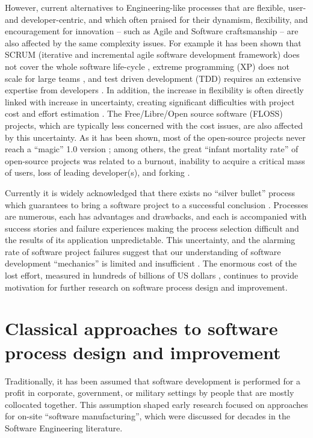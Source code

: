 However, current alternatives to Engineering-like processes that are flexible, user- and developer-centric,
and which often praised for their dynamism, flexibility, and encouragement for innovation --
such as Agile and Software craftsmanship -- are also affected by the same complexity issues. 
For example it has been shown that SCRUM (iterative and incremental agile software development framework) 
does not cover the whole software life-cycle \cite{Cohn_SCRUM}, 
extreme programming (XP) does not scale for large teams \cite{Beck_XP}, 
and test driven development (TDD) requires an extensive expertise from developers \cite{Beck_TDD}.
In addition, the increase in flexibility is often directly linked with increase in uncertainty, creating 
significant difficulties with project cost and effort estimation \cite{citeulike:12933080} \cite{citeulike:9928907}.
The Free/Libre/Open source software (FLOSS) projects, which are typically less concerned with the cost issues, 
are also affected by this uncertainty. 
As it has been shown, most of the open-source projects never reach a ``magic'' 1.0 version 
\cite{citeulike:12480029}; among others, the great ``infant mortality rate'' of open-source 
projects was related to a burnout, inability to acquire a critical mass of users, 
loss of leading developer(s), and forking \cite{richter2007critique}. 

Currently it is widely acknowledged that there exists no ``silver bullet'' process which 
guarantees to bring a software project to a successful conclusion \cite{citeulike:1986013}. 
Processes are numerous, each has advantages and drawbacks, and each is accompanied with 
success stories and failure experiences making the process selection difficult and the results of 
its application unpredictable.
This uncertainty, and the alarming rate of software project failures suggest that our understanding 
of software development ``mechanics'' is limited and insufficient \cite{citeulike:12550665}. 
The enormous cost of the lost effort, measured in hundreds of billions of US dollars 
\cite{citeulike:2207657} \cite{citeulike:2207653} \cite{citeulike:2207655}, 
continues to provide motivation for further research on software process design and improvement. 

%
%
\section{Classical approaches to software process design and improvement}\label{section_software_process_design}
Traditionally, it has been assumed that software development is performed for a profit in 
corporate, government, or military settings by people that are mostly collocated together. 
This assumption shaped early research focused on approaches for on-site ``software manufacturing'',
which were discussed for decades in the Software Engineering literature. 

